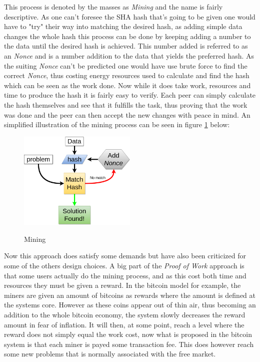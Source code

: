 \documentclass[paper=a4, fontsize=11pt]{scrartcl} %
\numberwithin{equation}{section} %
\numberwithin{figure}{section} %
\numberwithin{table}{section} %
\begin{document}
This process is denoted by the masses as \textit{Mining} and the name is fairly descriptive. As one can't foresee the SHA hash that's going to be given one would have to "try" their way into matching the desired hash, as adding simple data changes the whole hash this process can be done by keeping adding a number to the data until the desired hash is achieved. This number added is referred to as an \textit{Nonce} and is a number addition to the data that yields the preferred hash\cite{nonce}. As the suiting \textit{Nonce} can't be predicted one would have use brute force to find the correct \textit{Nonce}, thus costing energy resources used to calculate and find the hash which can be seen as the work done. Now while it does take work, resources and time to produce the hash it is fairly easy to verify. Each peer can simply calculate the hash themselves and see that it fulfills the task, thus proving that the work was done and the peer can then accept the new changes with peace in mind. An simplified illustration of the mining process can be seen in figure \ref{fig:mining} below:

\begin{figure}[H]
  \caption{Mining}
  \centering
    \includegraphics[width=0.5\textwidth]{mining.png}
  \label{fig:mining}
\end{figure}

Now this approach does satisfy some demands but have also been criticized for some of the others design choices. A big part of the \textit{Proof of Work} approach is that some users actually do the mining process, and as this cost both time and resources they must be given a reward. In the bitcoin model for example, the miners are given an amount of bitcoins as rewards where the amount is defined at the systems core. However as these coins appear out of thin air, thus becoming an addition to the whole bitcoin economy, the system slowly decreases the reward amount in fear of inflation\cite{mining}. It will then, at some point, reach a level where the reward does not simply equal the work cost, now what is proposed in the bitcoin system is that each miner is payed some transaction fee. This does however reach some new problems that is normally associated with the free market.\\
\end{document}
